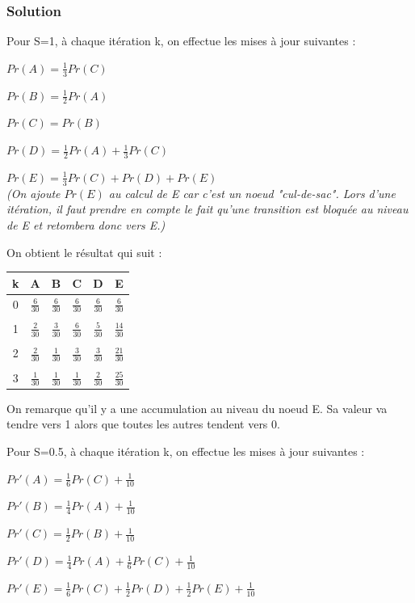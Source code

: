     \subsubsection*{Solution}
    Pour S=1, à chaque itération k, on effectue les mises à jour suivantes :
    \begin{description}
        \item $Pr(A) = \frac{1}{3} Pr(C)$
        \item $Pr(B) = \frac{1}{2} Pr(A)$
        \item $Pr(C) = Pr(B)$
        \item $Pr(D) = \frac{1}{2} Pr(A) + \frac{1}{3} Pr(C)$
        \item $Pr(E) = \frac{1}{3} Pr(C) + Pr(D) + Pr(E)$ \\
        \textit{(On ajoute $Pr(E)$ au calcul de E car c'est un noeud "cul-de-sac". Lors d'une itération, il faut prendre en compte le fait qu'une transition est bloquée au niveau de E et retombera donc vers E.)}
    \end{description}
    
    On obtient le résultat qui suit :
    \begin{center}
        \begin{tabular}{c|ccccc}
        k & A & B & C & D & E\\ \hline 
    	0 & $\frac{6}{30}$ & $\frac{6}{30}$ & $\frac{6}{30}$ & $\frac{6}{30}$ & $\frac{6}{30}$\\ \\
    	1 & $\frac{2}{30}$ & $\frac{3}{30}$ & $\frac{6}{30}$ & $\frac{5}{30}$ & $\frac{14}{30}$\\ \\
    	2 & $\frac{2}{30}$ & $\frac{1}{30}$ & $\frac{3}{30}$ & $\frac{3}{30}$ & $\frac{21}{30}$\\ \\
    	3 & $\frac{1}{30}$ & $\frac{1}{30}$ & $\frac{1}{30}$ & $\frac{2}{30}$ & $\frac{25}{30}$\\
    	\end{tabular}
    \end{center}
    
    On remarque qu'il y a une accumulation au niveau du noeud E.
    Sa valeur va tendre vers 1 alors que toutes les autres tendent vers 0.
    
    Pour S=0.5, à chaque itération k, on effectue les mises à jour suivantes :
    \begin{description}
        \item $Pr'(A) = \frac{1}{6} Pr(C) + \frac{1}{10}$
        \item $Pr'(B) = \frac{1}{4} Pr(A) + \frac{1}{10}$
        \item $Pr'(C) = \frac{1}{2} Pr(B) + \frac{1}{10}$
        \item $Pr'(D) = \frac{1}{4} Pr(A) + \frac{1}{6} Pr(C) + \frac{1}{10}$
        \item $Pr'(E) = \frac{1}{6} Pr(C) + \frac{1}{2} Pr(D) + \frac{1}{2} Pr(E) + \frac{1}{10}$
    \end{description}
    
